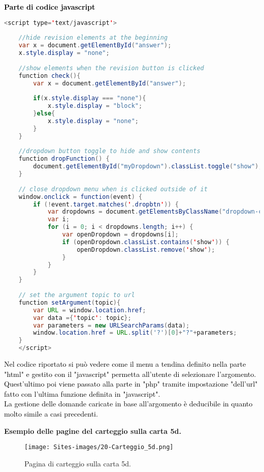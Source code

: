 \textcolor{black}{\textbf{Parte di codice javascript}}\\

\begin{lstlisting}[language=java]
	<script type='text/javascript'>
	
	//hide revision elements at the beginning
	var x = document.getElementById("answer");
	x.style.display = "none";
	
	//show elements when the revision button is clicked
	function check(){
		var x = document.getElementById("answer");
		
		if(x.style.display === "none"){
			x.style.display = "block";
		}else{
			x.style.display = "none";
		}	
	}
	
	//dropdown button toggle to hide and show contents
	function dropFunction() {
		document.getElementById("myDropdown").classList.toggle("show");
	}
	
	// close dropdown menu when is clicked outside of it
	window.onclick = function(event) {
		if (!event.target.matches('.dropbtn')) {
			var dropdowns = document.getElementsByClassName("dropdown-content");
			var i;
			for (i = 0; i < dropdowns.length; i++) {
				var openDropdown = dropdowns[i];
				if (openDropdown.classList.contains('show')) {
					openDropdown.classList.remove('show');
				}
			}
		}
	}
	
	// set the argument topic to url
	function setArgument(topic){
		var URL = window.location.href;
		var data ={'topic': topic};
		var parameters = new URLSearchParams(data);
		window.location.href = URL.split('?')[0]+"?"+parameters;
	}
	</script>
\end{lstlisting}

\begin{minipage}{\textwidth}
	\vspace*{-4cm}
	
	\textcolor{black}{Nel codice riportato si può vedere come il menu a tendina definito nella parte "html" e gestito con il "javascript" permetta all'utente di selezionare l'argomento. Quest'ultimo poi viene passato alla parte in "php" tramite impostazione "dell'url" fatto con l'ultima funzione definita in "javascript".\\
	La gestione delle domande caricate in base all'argomento è deducibile in quanto molto simile a casi precedenti.}\\
\end{minipage}%

\begin{minipage}{\textwidth}
	\begin{center}
		\textbf{Esempio delle pagine del carteggio sulla carta 5d.}
	\end{center}
	
	\begin{figure}[H]
		\begin{center}
			\texttt{[image: Sites-images/20-Carteggio\_5d.png]}
			\caption{Pagina di carteggio sulla carta 5d.}
		\end{center}
	\end{figure}
	\end{minipage}
	
